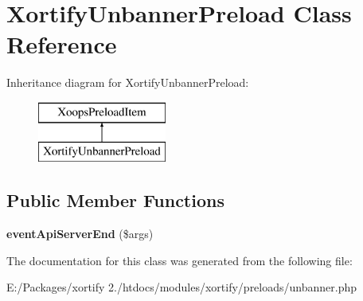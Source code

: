 \hypertarget{class_xortify_unbanner_preload}{\section{Xortify\-Unbanner\-Preload Class Reference}
\label{class_xortify_unbanner_preload}
}
Inheritance diagram for Xortify\-Unbanner\-Preload\-:\begin{figure}[H]
\begin{center}
\leavevmode
\includegraphics[height=2.000000cm]{class_xortify_unbanner_preload}
\end{center}
\end{figure}
\subsection*{Public Member Functions}
\begin{DoxyCompactItemize}
\item 
\hypertarget{class_xortify_unbanner_preload_a25419780ba91bd542644be9cd6ce49fd}{{\bfseries event\-Api\-Server\-End} (\$args)}\label{class_xortify_unbanner_preload_a25419780ba91bd542644be9cd6ce49fd}

\end{DoxyCompactItemize}


The documentation for this class was generated from the following file\-:\begin{DoxyCompactItemize}
\item 
E\-:/\-Packages/xortify 2./htdocs/modules/xortify/preloads/unbanner.\-php\end{DoxyCompactItemize}
